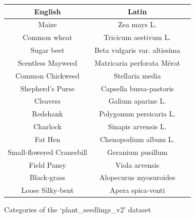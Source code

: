 \documentclass[english]{lni}
\begin{document}
\begin{figure}[ht]
\centering
\begin{tabular}{|c|c|c|}
\hline
    English & Latin \\
\hline
    Maize & Zea mays L.\\
    Common wheat & Tricicum aestivum L.\\
    Sugar beet & Beta vulgaris var. altissima\\
    Scentless Mayweed & Matricaria perforata Mérat\\
    Common Chickweed & Stellaria media\\
    Shepherd’s Purse & Capsella bursa-pastoris\\
    Cleavers& Galium aparine L.\\
    Redshank& Polygonum persicaria L.\\
    Charlock& Sinapis arvensis L.\\
    Fat Hen& Chenopodium album L.\\
    Small-flowered Cranesbill & Geranium pusillum\\
    Field Pansy& Viola arvensis\\
    Black-grass& Alopecurus myosuroides\\
    Loose Silky-bent& Apera spica-venti\\
    \hline
\end{tabular}
\caption{Categories of the ‘plant\_seedlings\_v2’ dataset \cite{giselsson2017public} }
\label{tab:dataset_species}
\end{figure}
\end{document}
